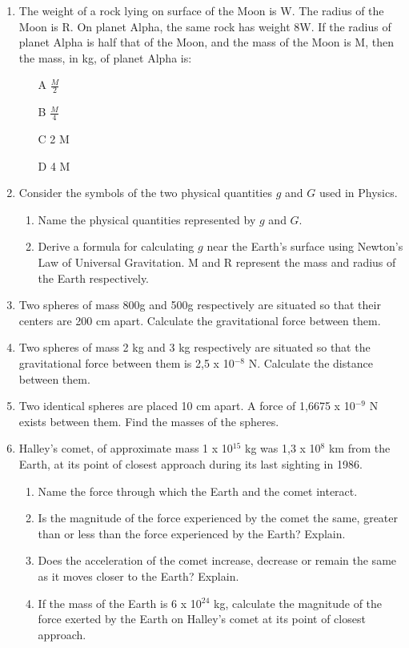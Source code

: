 \begin{enumerate}
\item {The weight of a rock lying on surface of the Moon is W. The radius of the Moon is R. On planet Alpha, the same rock has weight 8W. If the radius of planet Alpha is half that of the Moon, and the mass of the Moon is M, then the mass, in kg, of planet Alpha is:	
\begin{enumerate}
\item [A] $\frac{M}{2}$
\item [B] $\frac{M}{4}$
\item [C] 2 M
\item [D] 4 M
\end{enumerate}	}			

\item {Consider the symbols of the two physical quantities $g$ and $G$ used in Physics.
\begin{enumerate}
\item Name the physical quantities represented by $g$ and $G$.
\item Derive a formula for calculating $g$ near the Earth's surface using Newton's Law of Universal Gravitation. M and R represent the mass and radius of the Earth respectively.
\end{enumerate}
}

\item {Two spheres of mass 800g and 500g respectively are situated so that their centers are 200 cm apart. Calculate the gravitational force between them.}

\item {Two spheres of mass 2 kg and 3 kg respectively are situated so that the gravitational force between them is 2,5 x 10$^{-8}$ N. Calculate the distance between them.}

\item {Two identical spheres are placed 10 cm apart. A force of 1,6675 x 10$^{-9}$ N exists between them. Find the masses of the spheres.}

\item {Halley's comet, of approximate mass 1 x 10$^{15}$ kg was 1,3 x 10$^8$ km from the Earth, 
      at its point of closest approach during its last sighting in 1986.
\begin{enumerate}
\item Name the force through which the Earth and the comet interact.
\item Is the magnitude of the force experienced by the comet the same, greater than or less than the force experienced by the Earth? Explain.
\item Does the acceleration of the comet increase, decrease or remain the same as it moves closer to the Earth? Explain.
\item If the mass of the Earth is 6 x 10$^{24}$ kg, calculate the magnitude of the force exerted by the Earth on Halley's comet at its point of closest approach.
\end{enumerate}
}

\end{enumerate}


